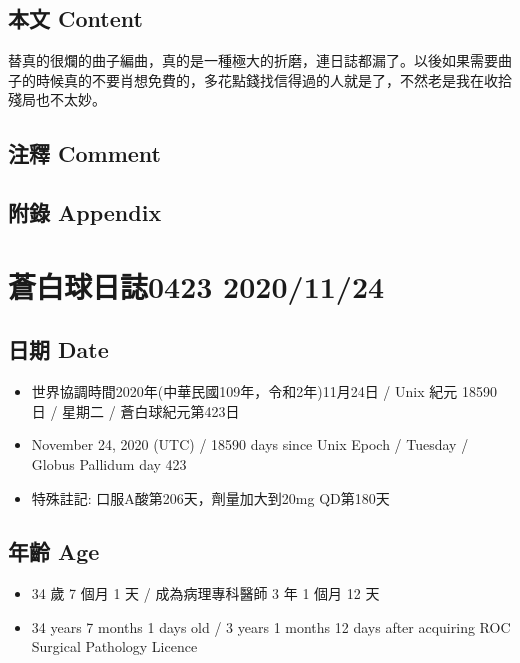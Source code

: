 \documentclass[
]{article}
\providecommand{\tightlist}{%
  \setlength{\itemsep}{0pt}\setlength{\parskip}{0pt}}
\begin{document}
\hypertarget{ux672cux6587-content-74}{%
\subsection{本文 Content}\label{ux672cux6587-content-74}}

替真的很爛的曲子編曲，真的是一種極大的折磨，連日誌都漏了。以後如果需要曲子的時候真的不要肖想免費的，多花點錢找信得過的人就是了，不然老是我在收拾殘局也不太妙。

\hypertarget{ux6ce8ux91cb-comment-74}{%
\subsection{注釋 Comment}\label{ux6ce8ux91cb-comment-74}}

\hypertarget{ux9644ux9304-appendix-74}{%
\subsection{附錄 Appendix}\label{ux9644ux9304-appendix-74}}

\hypertarget{ux84bcux767dux7403ux65e5ux8a8c0423-20201124}{%
\section{蒼白球日誌0423
2020/11/24}\label{ux84bcux767dux7403ux65e5ux8a8c0423-20201124}}

\hypertarget{ux65e5ux671f-date-75}{%
\subsection{日期 Date}\label{ux65e5ux671f-date-75}}

\begin{itemize}
\tightlist
\item
  世界協調時間2020年(中華民國109年，令和2年)11月24日 / Unix 紀元 18590
  日 / 星期二 / 蒼白球紀元第423日
\item
  November 24, 2020 (UTC) / 18590 days since Unix Epoch / Tuesday /
  Globus Pallidum day 423
\item
  特殊註記: 口服A酸第206天，劑量加大到20mg QD第180天
\end{itemize}

\hypertarget{ux5e74ux9f61-age-75}{%
\subsection{年齡 Age}\label{ux5e74ux9f61-age-75}}

\begin{itemize}
\tightlist
\item
  34 歲 7 個月 1 天 / 成為病理專科醫師 3 年 1 個月 12 天
\item
  34 years 7 months 1 days old / 3 years 1 months 12 days after
  acquiring ROC Surgical Pathology Licence
\end{itemize}
\end{document}
